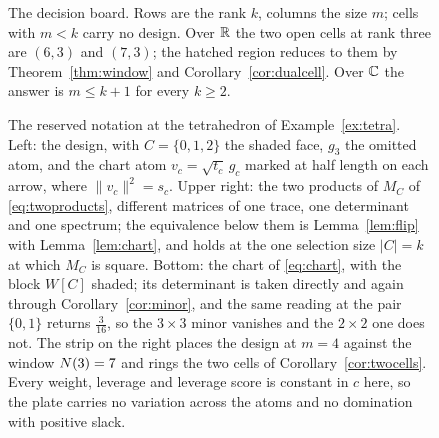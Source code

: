 \begin{figure}[ht]
  \centering
  
  \caption{The decision board.  Rows are the rank $k$, columns the size
  $m$; cells with $m<k$ carry no design.  Over $\mathbb{R}$ the two open cells at
  rank three are $(6,3)$ and $(7,3)$; the hatched region reduces to them
  by Theorem~\ref{thm:window} and Corollary~\ref{cor:dualcell}.  Over
  $\mathbb{C}$ the answer is $m\le k+1$ for every $k\ge2$.}
  \label{fig:board}
\end{figure}

\begin{figure}[ht]
  \centering
  
  \caption{The reserved notation at the tetrahedron of
  Example~\ref{ex:tetra}.  Left: the design, with $C=\{0,1,2\}$ the shaded
  face, $g_3$ the omitted atom, and the chart atom $v_c=\sqrt{t_c}\,g_c$
  marked at half length on each arrow, where $\lVert v_c\rVert^2=s_c$.
  Upper right: the two products of $M_C$ of \eqref{eq:twoproducts},
  different matrices of one trace, one determinant and one spectrum; the
  equivalence below them is Lemma~\ref{lem:flip} with Lemma~\ref{lem:chart},
  and holds at the one selection size $\lvert C\rvert=k$ at which $M_C$ is
  square.  Bottom: the chart of \eqref{eq:chart}, with the block $W[C]$
  shaded; its determinant is taken directly and again through
  Corollary~\ref{cor:minor}, and the same reading at the pair $\{0,1\}$
  returns $\tfrac3{16}$, so the $3\times3$ minor vanishes and the
  $2\times2$ one does not.  The strip on the right places the design at $m=4$ against the
  window $N(3)=7$ and rings the two cells of
  Corollary~\ref{cor:twocells}.  Every weight, leverage and leverage score
  is constant in $c$ here, so the plate carries no variation across the
  atoms and no domination with positive slack.}
  \label{fig:notation}
\end{figure}

